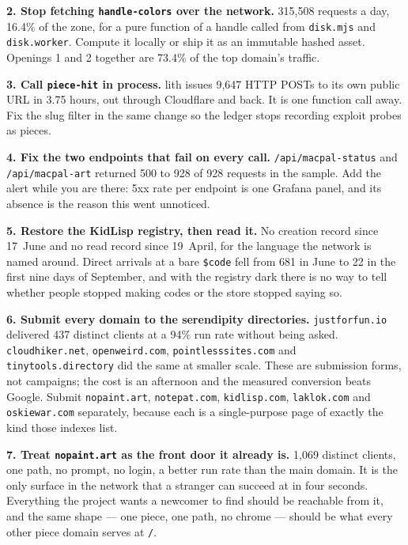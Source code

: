 \documentclass[10pt,letterpaper,twocolumn]{article}
\begin{document}
\textbf{2. Stop fetching \texttt{handle-colors} over the network.}
315,508 requests a day, 16.4\% of the zone, for a pure function of a
handle called from \texttt{disk.mjs} and \texttt{disk.worker}. Compute
it locally or ship it as an immutable hashed asset. Openings 1 and 2
together are 73.4\% of the top domain's traffic.

\textbf{3. Call \texttt{piece-hit} in process.} lith issues 9,647 HTTP
POSTs to its own public URL in 3.75 hours, out through Cloudflare and
back. It is one function call away. Fix the slug filter in the same
change so the ledger stops recording exploit probes as pieces.

\textbf{4. Fix the two endpoints that fail on every call.}
\texttt{/api/macpal-status} and \texttt{/api/macpal-art} returned 500
to 928 of 928 requests in the sample. Add the alert while you are
there: 5xx rate per endpoint is one Grafana panel, and its absence is
the reason this went unnoticed.

\textbf{5. Restore the KidLisp registry, then read it.} No creation
record since 17~June and no read record since 19~April, for the
language the network is named around. Direct arrivals at a bare \texttt{\$code} fell from 681 in June to 22
in the first nine days of September, and with the registry dark there
is no way to tell whether people stopped making codes or the store
stopped saying so.

\textbf{6. Submit every domain to the serendipity directories.}
\texttt{justforfun.io} delivered 437 distinct clients at a 94\% run
rate without being asked. \texttt{cloudhiker.net},
\texttt{openweird.com}, \texttt{pointlesssites.com} and
\texttt{tinytools.directory} did the same at smaller scale. These are
submission forms, not campaigns; the cost is an afternoon and the
measured conversion beats Google. Submit \texttt{nopaint.art},
\texttt{notepat.com}, \texttt{kidlisp.com}, \texttt{laklok.com} and
\texttt{oskiewar.com} separately, because each is a single-purpose page
of exactly the kind those indexes list.

\textbf{7. Treat \texttt{nopaint.art} as the front door it already
is.} 1,069 distinct clients, one path, no prompt, no login, a better
run rate than the main domain. It is the only surface in the network
that a stranger can succeed at in four seconds. Everything the project
wants a newcomer to find should be reachable from it, and the same
shape --- one piece, one path, no chrome --- should be what every other
piece domain serves at \texttt{/}.
\end{document}
